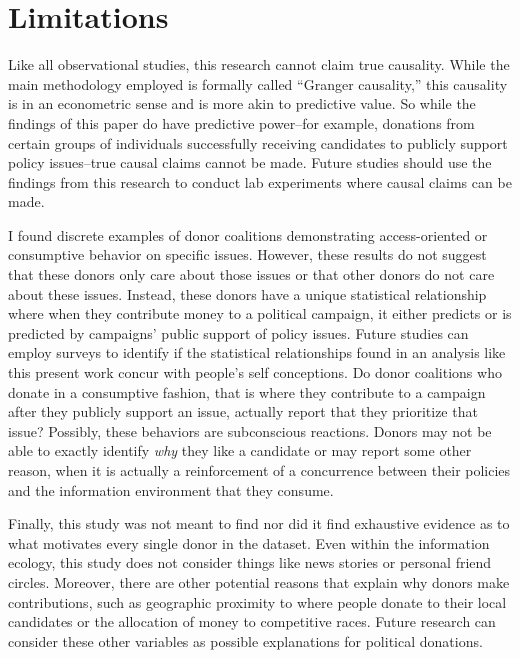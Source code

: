 \documentclass[12pt,]{article}
\begin{document}
\hypertarget{limitations}{%
\section{Limitations}\label{limitations}}

Like all observational studies, this research cannot claim true
causality. While the main methodology employed is formally called
``Granger causality,'' this causality is in an econometric sense and is
more akin to predictive value. So while the findings of this paper do
have predictive power--for example, donations from certain groups of
individuals successfully receiving candidates to publicly support policy
issues--true causal claims cannot be made. Future studies should use the
findings from this research to conduct lab experiments where causal
claims can be made.

I found discrete examples of donor coalitions demonstrating
access-oriented or consumptive behavior on specific issues. However,
these results do not suggest that these donors only care about those
issues or that other donors do not care about these issues. Instead,
these donors have a unique statistical relationship where when they
contribute money to a political campaign, it either predicts or is
predicted by campaigns' public support of policy issues. Future studies
can employ surveys to identify if the statistical relationships found in
an analysis like this present work concur with people's self
conceptions. Do donor coalitions who donate in a consumptive fashion,
that is where they contribute to a campaign after they publicly support
an issue, actually report that they prioritize that issue? Possibly,
these behaviors are subconscious reactions. Donors may not be able to
exactly identify \emph{why} they like a candidate or may report some
other reason, when it is actually a reinforcement of a concurrence
between their policies and the information environment that they
consume.

Finally, this study was not meant to find nor did it find exhaustive
evidence as to what motivates every single donor in the dataset. Even
within the information ecology, this study does not consider things like
news stories or personal friend circles. Moreover, there are other
potential reasons that explain why donors make contributions, such as
geographic proximity to where people donate to their local candidates or
the allocation of money to competitive races. Future research can
consider these other variables as possible explanations for political
donations.
\end{document}
